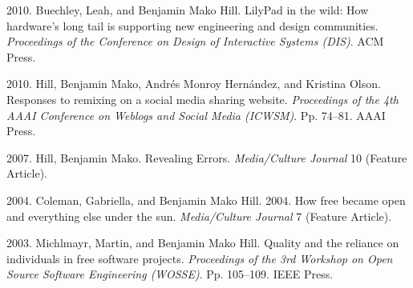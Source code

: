 \documentclass[10pt]{article}
\newenvironment{cvlist}{
\begin{list}{}{\leftmargin=3.0em \itemindent=-3.0em}
  \setlength{\itemsep}{0pt}
  \setlength{\parskip}{0em}
  \setlength{\parsep}{1em}
  \setlength{\parindent}{0em}}
{\vspace{1em}
\end{list}}
\begin{document}
\begin{cvlist}
\item 2010. Buechley, Leah, and Benjamin Mako Hill. LilyPad in the wild: How hardware's long tail is supporting new engineering and design communities. \emph{Proceedings of the Conference on Design of Interactive Systems (DIS)}. ACM Press.
\item 2010. Hill, Benjamin Mako, Andrés Monroy Hernández, and Kristina Olson. Responses to remixing on a social media sharing website. \emph{Proceedings of the 4th AAAI Conference on Weblogs and Social Media (ICWSM)}. Pp. 74--81. AAAI Press. %
\item 2007. Hill, Benjamin Mako. Revealing Errors. \emph{Media/Culture Journal} 10 (Feature Article).
\item 2004. Coleman, Gabriella, and Benjamin Mako Hill. 2004. How free became open and everything else under the sun. \emph{Media/Culture Journal} 7 (Feature Article).
\item 2003. Michlmayr, Martin, and Benjamin Mako Hill. Quality and the reliance on individuals in free software projects. \emph{Proceedings of the 3rd Workshop on Open Source Software Engineering (WOSSE)}. Pp. 105--109. IEEE Press.
\end{cvlist}
\end{document}
